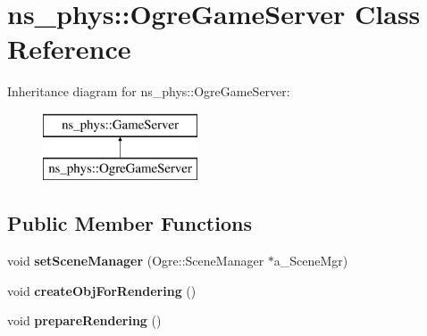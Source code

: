 \hypertarget{classns__phys_1_1_ogre_game_server}{}\section{ns\+\_\+phys\+:\+:Ogre\+Game\+Server Class Reference}
\label{classns__phys_1_1_ogre_game_server}
Inheritance diagram for ns\+\_\+phys\+:\+:Ogre\+Game\+Server\+:\begin{figure}[H]
\begin{center}
\leavevmode
\includegraphics[height=2.000000cm]{classns__phys_1_1_ogre_game_server}
\end{center}
\end{figure}
\subsection*{Public Member Functions}
\begin{DoxyCompactItemize}
\item 
void {\bfseries set\+Scene\+Manager} (Ogre\+::\+Scene\+Manager $\ast$a\+\_\+\+Scene\+Mgr)\hypertarget{classns__phys_1_1_ogre_game_server_ab53179cb3c5b5729b00d2142bc73f848}{}\label{classns__phys_1_1_ogre_game_server_ab53179cb3c5b5729b00d2142bc73f848}

\item 
void {\bfseries create\+Obj\+For\+Rendering} ()\hypertarget{classns__phys_1_1_ogre_game_server_aae5562a85894cf4815957017af4ac948}{}\label{classns__phys_1_1_ogre_game_server_aae5562a85894cf4815957017af4ac948}

\item 
void {\bfseries prepare\+Rendering} ()\hypertarget{classns__phys_1_1_ogre_game_server_afef84e66bd5979c1ad5aabccf0e1d656}{}\label{classns__phys_1_1_ogre_game_server_afef84e66bd5979c1ad5aabccf0e1d656}

\end{DoxyCompactItemize}
